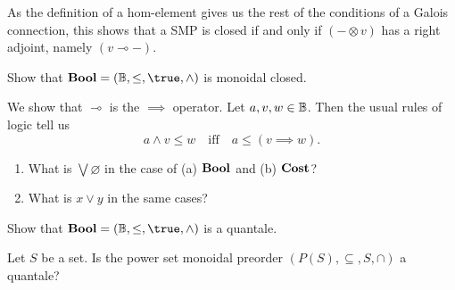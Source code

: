 As the definition of a hom-element gives us the rest of the conditions of a Galois connection, this shows that a SMP is closed if and only if $(-\otimes v)$ has a right adjoint, namely $(v\multimap-)$.

Show that $\Bool=(\B,\leq,\true,\land)$ is monoidal closed.

\solution
We show that $\multimap$ is the $\implies$ operator.  Let $a,v,w\in\mathbb{B}$.  Then the usual rules of logic tell us
$$ a\land v\leq w \quad\textrm{iff}\quad a\leq (v\implies w).$$

\begin{enumerate}
	\item What is $\bigvee\varnothing$ in the case of (a) $\textbf{Bool}$ and (b) $\textbf{Cost}$?
	\item What is $x\lor y$ in the same cases?
\end{enumerate}

\solution

Show that $\Bool=(\B,\leq,\true,\land)$ is a quantale.

\solution

Let $S$ be a set.  Is the power set monoidal preorder $(P(S),\subseteq, S, \cap)$ a quantale?

\solution





